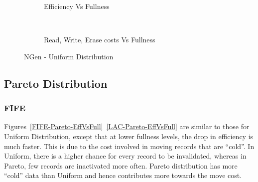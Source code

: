 \begin{figure}[H]
        \centering
        \begin{subfigure}[b]{0.4\textwidth}
                \centering
                \caption{Efficiency Vs Fullness} \label{NGen-Uniform-EffVsFull}
        \end{subfigure}
        ~~~ %
        \begin{subfigure}[b]{0.4\textwidth}
                \centering
                \caption{Read, Write, Erase costs Vs Fullness} \label{NGen-Uniform-RdWrEraseVsFull}
        \end{subfigure}
        \caption{NGen - Uniform Distribution}
\end{figure}


\subsection{Pareto Distribution}

\subsubsection{FIFE}

Figures~\ref{FIFE-Pareto-EffVsFull}~\ref{LAC-Pareto-EffVsFull} are similar to those for Uniform Distribution, except that at lower fullness levels, the drop in efficiency is much faster. This is due to the cost involved in moving records that are ``cold''. In Uniform, there is a higher chance for every record to be invalidated, whereas in Pareto, few records are inactivated more often. Pareto distribution has more ``cold'' data than Uniform and hence contributes more towards the move cost. 

